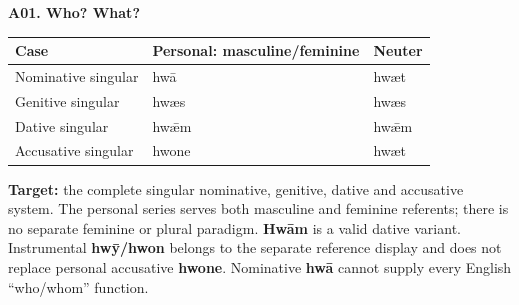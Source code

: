 \par\begin{minipage}{\linewidth}\raggedright
\textbf{A01. Who? What?}

\par\begingroup
\fontsize{10.5}{13.2}\selectfont
\setlength{\LTleft}{0pt}\setlength{\LTright}{\fill}
\noindent
\begin{tabular}{@{}>{\raggedright\arraybackslash}p{35.73mm}>{\raggedright\arraybackslash}p{57.22mm}>{\raggedright\arraybackslash}p{25.43mm}@{}}
\toprule
\textbf{Case} & \textbf{Personal: masculine/\allowbreak{}feminine} & \textbf{Neuter} \\
\midrule
Nominative singular & hwā & hwæt \\
Genitive singular & hwæs & hwæs \\
Dative singular & hwǣm & hwǣm \\
Accusative singular & hwone & hwæt \\
\bottomrule
\end{tabular}
\par\endgroup

\textbf{Target:} the complete singular nominative, genitive, dative and accusative system. The personal series serves both masculine and feminine referents; there is no separate feminine or plural paradigm. \textbf{Hwām} is a valid dative variant. Instrumental \textbf{hwȳ/\allowbreak{}hwon} belongs to the separate reference display and does not replace personal accusative \textbf{hwone}. Nominative \textbf{hwā} cannot supply every English “who/\allowbreak{}whom” function.

\end{minipage}\par\addvspace{4pt}

